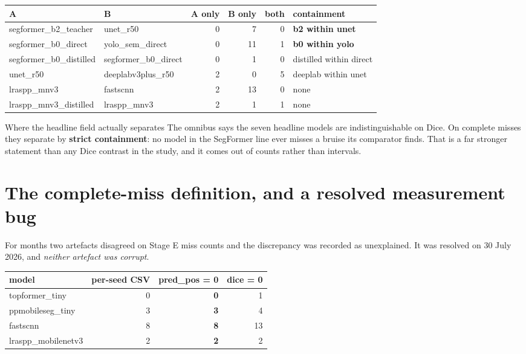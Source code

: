 \documentclass[11pt]{article}
\begin{document}
\begin{center}
\small\setlength{\tabcolsep}{4pt}
\begin{tabular}{p{3.85cm}p{3.15cm}nnnl}
\toprule
\textbf{A} & \textbf{B} & \textbf{A only} & \textbf{B only} & \textbf{both} & \textbf{containment} \\
\midrule
segformer\_b2\_teacher & unet\_r50 & 0 & 7 & 0 & \textbf{b2 within unet} \\
segformer\_b0\_direct & yolo\_sem\_direct & 0 & 11 & 1 & \textbf{b0 within yolo} \\
segformer\_b0\_distilled & segformer\_b0\_direct & 0 & 1 & 0 & distilled within direct \\
unet\_r50 & deeplabv3plus\_r50 & 2 & 0 & 5 & deeplab within unet \\
lraspp\_mnv3 & fastscnn & 2 & 13 & 0 & none \\
lraspp\_mnv3\_distilled & lraspp\_mnv3 & 2 & 1 & 1 & none \\
\bottomrule
\end{tabular}
\end{center}

\begin{keybox}{Where the headline field actually separates}
The omnibus says the seven headline models are indistinguishable on Dice. On
complete misses they separate by \textbf{strict containment}: no model in the
SegFormer line ever misses a bruise its comparator finds. That is a far stronger
statement than any Dice contrast in the study, and it comes out of counts rather
than intervals.
\end{keybox}

\section{The complete-miss definition, and a resolved measurement bug}

For months two artefacts disagreed on Stage E miss counts and the discrepancy was
recorded as unexplained. It was resolved on 30 July 2026, and \emph{neither
artefact was corrupt}.

\begin{center}
\begin{tabular}{Lnnn}
\toprule
\textbf{model} & \textbf{per-seed CSV} & \textbf{pred\_pos = 0} & \textbf{dice = 0} \\
\midrule
topformer\_tiny & 0 & \textbf{0} & 1 \\
ppmobileseg\_tiny & 3 & \textbf{3} & 4 \\
fastscnn & 8 & \textbf{8} & 13 \\
lraspp\_mobilenetv3 & 2 & \textbf{2} & 2 \\
\bottomrule
\end{tabular}
\end{center}
\end{document}
